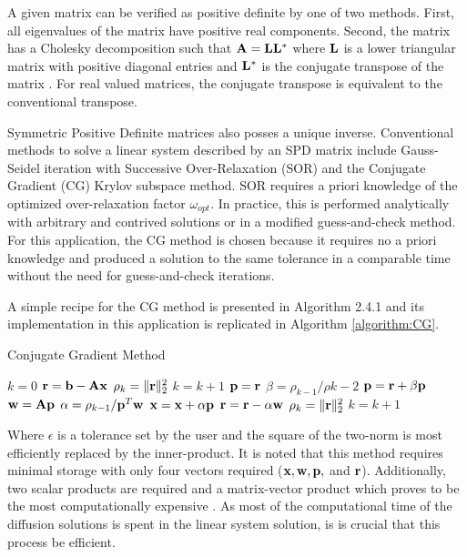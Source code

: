     A given matrix can be verified as positive definite by one of two methods.
    First, all eigenvalues of the matrix have positive real components. Second, 
    the matrix has a Cholesky decomposition such that $\mathbf{A} = \mathbf{L} \mathbf{L}^*$ where 
    $\mathbf{L}$ is a lower triangular matrix with positive diagonal entries and 
    $\mathbf{L}^*$ is the conjugate transpose of the matrix \cite{textbookipsen}. For 
    real valued matrices, the conjugate transpose is equivalent to the 
    conventional transpose.
    
    Symmetric Positive Definite matrices also posses a unique inverse. 
    Conventional methods to solve a linear system described by an SPD matrix 
    include Gauss-Seidel iteration with Successive Over-Relaxation (SOR) and
    the Conjugate Gradient (CG) Krylov subspace method. SOR requires a priori 
    knowledge of the optimized  over-relaxation factor $\omega_{opt}$. In 
    practice, this is performed analytically with arbitrary and contrived 
    solutions or in a modified guess-and-check method. For this application, the
    CG method is chosen because it requires no a priori knowledge and produced
    a solution to the same tolerance in a comparable time without the need for 
    guess-and-check iterations.
    
    A simple recipe for the CG method is presented in Algorithm 2.4.1
    \cite{Kelley1995IterativeEquations} and its implementation in this 
    application is replicated in Algorithm \ref{algorithm:CG}.
    
    \begin{algorithm}
      \caption{Conjugate Gradient Method}
      \label{algorithm:CG}
      \begin{algorithmic}[1]
        \State $k = 0$
        \State $\mathbf{r} = \mathbf{b} - \mathbf{A} \mathbf{x}$
        \State $\rho_k = \|\mathbf{r}\|_2^2$
        \State $k = k + 1$
            \State $\mathbf{p} = \mathbf{r}$
          \Else
            \State $\beta = \rho_{k-1} / \rho{k-2}$
            \State $\mathbf{p} = \mathbf{r} + \beta \mathbf{p}$
          \EndIf
          \State $\mathbf{w} = \mathbf{A} \mathbf{p}$
          \State $\alpha = \rho_{k-1} / \mathbf{p}^{T} \mathbf{w}$
          \State $\mathbf{x} = \mathbf{x} + \alpha \mathbf{p}$
          \State $\mathbf{r} = \mathbf{r} - \alpha \mathbf{w}$
          \State $\rho_k = \| \mathbf{r} \|_2^2$
          \State $k=k+1$
        \EndWhile
      \end{algorithmic}
    \end{algorithm}
    
    Where $\epsilon$ is a tolerance set by the user and the square of the 
    two-norm is most efficiently replaced by the inner-product. It is noted 
    that this method requires minimal storage with only four vectors 
    required ($\mathbf{x}, \mathbf{w}, \mathbf{p},$ and $\mathbf{r}$). Additionally, two scalar products 
    are required and a matrix-vector product which proves to be the most 
    computationally expensive \cite{Kelley1995IterativeEquations}. As most of 
    the computational time of the diffusion solutions is spent in the linear 
    system solution, is is crucial that this process be efficient.

